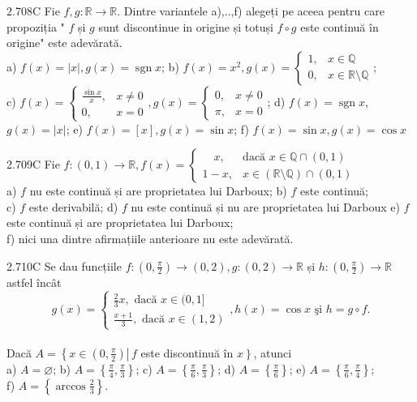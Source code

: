 \documentclass[11pt]{article}
\begin{document}
2.708C Fie $f, g: \mathbb{R} \rightarrow \mathbb{R}$. Dintre variantele a),..,f) alegeți pe aceea pentru care propoziția " $f$ și $g$ sunt discontinue in origine și totuși $f \circ g$ este continuă în origine" este adevărată.\\ a) $f(x)=|x|, g(x)=\operatorname{sgn} x$; b) $f(x)=x^{2}, g(x)=\left\{\begin{array}{ll}1, & x \in \mathbb{Q} \\ 0, & x \in \mathbb{R} \setminus \mathbb{Q}\end{array}\right.$;\\ c) $f(x)=\left\{\begin{array}{cc}\frac{\sin x}{x}, & x \neq 0 \\ 0, & x=0\end{array}, g(x)= \begin{cases}0, & x \neq 0 \\ \pi, & x=0\end{cases}\right.$; d) $f(x)=\operatorname{sgn} x$, $g(x)=|x|$; e) $f(x)=[x], g(x)=\sin x$; f) $f(x)=\sin x, g(x)=\cos x$

2.709C Fie $f: (0,1) \rightarrow \mathbb{R}, f(x)= \begin{cases}\quad x, & \text{dacă } x \in \mathbb{Q} \cap (0,1) \\ 1-x, & x \in (\mathbb{R} \setminus \mathbb{Q}) \cap (0,1)\end{cases}$\\ a) $f$ nu este continuă și are proprietatea lui Darboux; b) $f$ este continuă;\\ c) $f$ este derivabilă; d) $f$ nu este continuă și nu are proprietatea lui Darboux e) $f$ este continuă și are proprietatea lui Darboux;\\ f) nici una dintre afirmațiile anterioare nu este adevărată.

2.710C Se dau funcțiile $f:\left(0, \frac{\pi}{2}\right) \rightarrow(0,2), g:(0,2) \rightarrow \mathbb{R}$ și $h:\left(0, \frac{\pi}{2}\right) \rightarrow \mathbb{R}$ astfel încât $$g(x)=\left\{\begin{array}{l}\frac{2}{3} x, \text { dacă } x \in(0,1] \\\frac{x+1}{3}, \text { dacă } x \in(1,2)\end{array}, h(x)=\cos x \text { şi } h=g \circ f .\right.$$\\Dacă $A=\left\{\left.x \in\left(0, \frac{\pi}{2}\right) \right\rvert\, f\right.$ este discontinuă în $\left.x\right\}$, atunci\\ a) $A=\varnothing$; b) $A=\left\{\frac{\pi}{4}, \frac{\pi}{3}\right\}$; c) $A=\left\{\frac{\pi}{6}, \frac{\pi}{3}\right\}$; d) $A=\left\{\frac{\pi}{6}\right\}$; e) $A=\left\{\frac{\pi}{6}, \frac{\pi}{4}\right\}$;\\ f) $A=\left\{\arccos \frac{2}{3}\right\}$.
\end{document}
